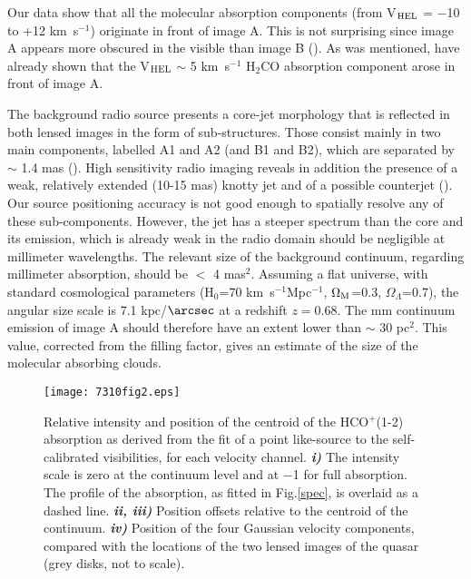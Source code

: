 \documentclass[oldversion]{aa}
\begin{document}
Our data show that all the molecular absorption components (from V$_{\rm HEL}$ = $-$10 to
+12 km~s$^{-1}$) originate in front of image A. This is not surprising since
image A appears more obscured in the visible than image B (\citealt{gru95}). As was mentioned,
\citet{men96} have already shown that the V$_{\rm HEL}$ $\sim$ 5 km~s$^{-1}$ H$_2$CO
absorption component arose in front of image A.

The background radio source presents a core-jet morphology that is reflected in both lensed
images in the form of sub-structures. Those consist mainly in two main components, labelled A1
and A2 (and B1 and B2), which are separated by $\sim$ 1.4 mas (\citealt{pat95}). High
sensitivity radio imaging reveals in addition the presence of a weak, relatively extended
(10-15 mas)  knotty jet and of a possible counterjet (\citealt{big03}). Our source positioning
accuracy is not good enough to spatially resolve any of these sub-components. However, the
jet has a steeper spectrum than the core and its emission, which is already weak in the
radio domain should be negligible at millimeter wavelengths. The relevant size of the
background continuum, regarding millimeter absorption, should be $<$ 4 mas$^2$.
Assuming a flat universe, with standard cosmological parameters (H$_0$=70 km~s$^{-1}$Mpc$^{-1}$,
$\Omega_{\rm M}$=0.3, $\Omega_\Lambda$=0.7), the angular size scale is 7.1 kpc/$\arcsec$ at a
redshift $z = 0.68$. The mm continuum emission of image A should therefore have an extent lower
than $\sim$ 30 pc$^2$. This value, corrected from the filling factor, gives an estimate of the size
of the molecular absorbing clouds.

\begin{figure}[h] \texttt{[image: 7310fig2.eps]}
\caption{Relative intensity and position of the centroid of the HCO$^+$(1-2) absorption 
as derived from the fit of a point like-source to the self-calibrated visibilities, for each velocity channel. 
{\bf \em i)} The intensity scale is zero at the continuum level and at $-$1 for full
absorption.
The profile of the absorption, as fitted in Fig.\ref{spec}, is overlaid as a dashed line.
{\bf \em ii, iii)} Position offsets relative to the centroid of the continuum.
{\bf \em iv)} Position of the four Gaussian velocity components, compared with the locations of the
two lensed images of the quasar (grey disks, not to scale).} 
\label{uvfit}
\end{figure}
\end{document}
